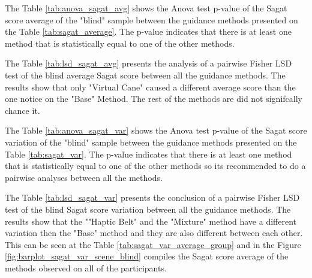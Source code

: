 %

\begin{table}[!htb]
    \begin{minipage}{.45\linewidth}
        
    \end{minipage}
    \hfill
    \begin{minipage}{.45\linewidth}
        \vspace{-2.75cm}
        
    \end{minipage}
\end{table}

The Table \ref{tab:anova_sagat_avg} shows the Anova test p-value of the Sagat score average of the "blind" sample between the guidance methods presented on the Table \ref{tab:sagat_average}. The p-value indicates that there is at least one method that is statistically equal to one of the other methods.



The Table \ref{tab:lsd_sagat_avg} presents the analysis of a pairwise Fisher LSD test of the blind average Sagat score  between all the guidance methods. The results show that only "Virtual Cane" caused a different average score than the one notice on the "Base" Method. The rest of the methods are did not signifcally chance it.



The Table \ref{tab:anova_sagat_var} shows the Anova test p-value of the Sagat score variation of the "blind" sample between the guidance methods presented on the Table \ref{tab:sagat_var}. The p-value indicates that there is at least one method that is statistically equal to one of the other methods so its recommended to do a pairwise analyses between all the methods.





The Table \ref{tab:lsd_sagat_var} presents the conclusion of a pairwise Fisher LSD test of the blind Sagat score variation between all the guidance methods. The results show that the ""Haptic Belt" and the "Mixture" method have a different variation then the "Base" method and they are also different between each other. This can be seen at the Table \ref{tab:sagat_var_average_group} and in the Figure \ref{fig:barplot_sagat_var_scene_blind} compiles the Sagat score average of the methods observed on all of the participants.

